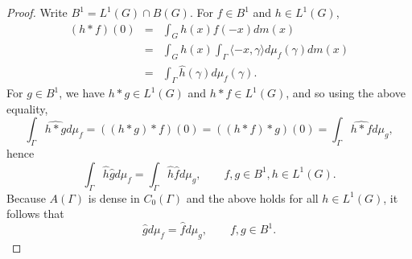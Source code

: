 \documentclass{article}
\newcommand{\inner}[2]{\langle #1, #2 \rangle}
\begin{document}
\begin{proof}
Write $B^1 = L^1(G) \cap B(G)$. For $f \in B^1$ and $h \in L^1(G)$,
\begin{eqnarray*}
(h*f)(0)&=&\int_G h(x) f(-x) dm(x)\\
&=&\int_G h(x) \int_\Gamma \inner{-x}{\gamma} d\mu_f(\gamma) dm(x)\\
&=&\int_\Gamma \hat{h}(\gamma) d\mu_f(\gamma).
\end{eqnarray*}
For $g \in B^1$, we have $h*g \in L^1(G)$ and $h*f \in L^1(G)$, and so using the above equality,
\[
\int_\Gamma \widehat{h*g} d\mu_f = ((h*g)*f)(0) = ((h*f)*g)(0) = \int_\Gamma \widehat{h*f} d\mu_g,
\]
hence 
\[
\int_\Gamma \hat{h} \hat{g} d\mu_f = \int_\Gamma \hat{h} \hat{f} d\mu_g, \qquad f,g \in B^1, h \in L^1(G).
\]
Because $A(\Gamma)$ is dense in $C_0(\Gamma)$ and the above holds for all $h \in L^1(G)$, it follows that
\begin{equation}
\hat{g} d\mu_f = \hat{f} d\mu_g, \qquad f,g \in B^1.
\label{swappy}
\end{equation}


\end{proof}
\end{document}
